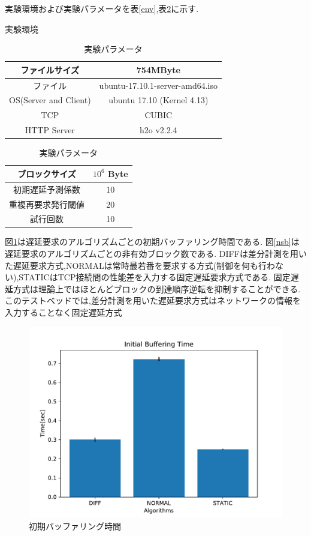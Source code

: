 \documentclass[a4j,12pt]{gradthesis_utf8}
\begin{document}
実験環境および実験パラメータを表\ref{env},表\ref{param}に示す.

\begin{table}[htb]
	\begin{center}
		\caption{実験環境}
		\label{env}
		\begin{tabular}{|c|c|} \hline
			ファイルサイズ & 754MByte\\ \hline
			ファイル &  ubuntu-17.10.1-server-amd64.iso\\ \hline
			OS(Server and Client) & ubuntu 17.10 (Kernel 4.13)\\ \hline
			TCP & CUBIC \\ \hline
			HTTP Server & h2o v2.2.4 \\ \hline
		\end{tabular}
		\caption{実験パラメータ}
		\label{param}
		\begin{tabular}{|c|c|} \hline
			ブロックサイズ & \(10^6\) Byte\\ \hline
			初期遅延予測係数 & 10 \\ \hline
			重複再要求発行閾値 & 20 \\ \hline
			試行回数 & 10 \\ \hline
		\end{tabular}
	\end{center}
\end{table}

\newpage

図\ref{ibt}は遅延要求のアルゴリズムごとの初期バッファリング時間である.
図\ref{nsb}は遅延要求のアルゴリズムごとの非有効ブロック数である.
DIFFは差分計測を用いた遅延要求方式,NORMALは常時最若番を要求する方式(制御を何も行わない),STATICはTCP接続間の性能差を入力する固定遅延要求方式である.
固定遅延方式は理論上ではほとんどブロックの到達順序逆転を抑制することができる.
このテストベッドでは,差分計測を用いた遅延要求方式はネットワークの情報を入力することなく固定遅延方式

\newpage

\begin{figure}[ht]
	\begin{center}
		\includegraphics[width=12.125cm]{figure/InitialBufferingTime.pdf}
		\caption{初期バッファリング時間}
		\label{ibt}
	\end{center}
\end{figure}
\end{document}
